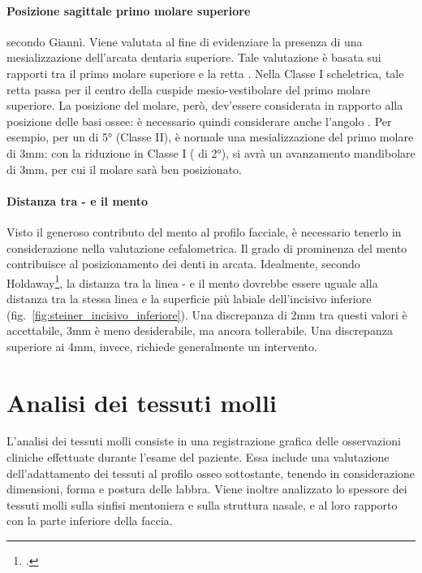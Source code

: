 \paragraph{Posizione sagittale primo molare superiore} secondo Giannì. Viene valutata al fine di evidenziare la presenza di una mesializzazione dell'arcata dentaria superiore. Tale valutazione è basata sui rapporti tra il primo molare superiore e la retta . Nella Classe I scheletrica, tale retta passa per il centro della cuspide mesio-vestibolare del primo molare superiore. La posizione del molare, però, dev'essere considerata in rapporto alla posizione delle basi ossee: è necessario quindi considerare anche l'angolo . Per esempio, per un  di 5° (Classe II), è normale una mesializzazione del primo molare di 3mm: con la riduzione in Classe I ( di 2°), si avrà un avanzamento mandibolare di 3mm, per cui il molare sarà ben posizionato.


\paragraph{Distanza tra - e il mento}
Visto il generoso contributo del mento al profilo facciale, è necessario tenerlo in considerazione nella valutazione cefalometrica. Il grado di prominenza del mento contribuisce al posizionamento dei denti in arcata. Idealmente, secondo Holdaway\footcite{Holdaway1956}, la distanza tra la linea - e il mento dovrebbe essere uguale alla distanza tra la stessa linea e la superficie più labiale dell'incisivo inferiore (fig.~\ref{fig:steiner_incisivo_inferiore}). Una discrepanza di 2mm tra questi valori è accettabile, 3mm è meno desiderabile, ma ancora tollerabile. Una discrepanza superiore ai 4mm, invece, richiede generalmente un intervento.

\section{Analisi dei tessuti molli}
L'analisi dei tessuti molli consiste in una registrazione grafica delle osservazioni cliniche effettuate durante l'esame del paziente. Essa include una valutazione dell'adattamento dei tessuti al profilo osseo sottostante, tenendo in considerazione dimensioni, forma e postura delle labbra. Viene inoltre analizzato lo spessore dei tessuti molli sulla sinfisi mentoniera e sulla struttura nasale, e al loro rapporto con la parte inferiore della faccia.

